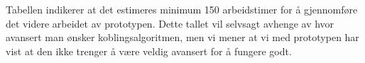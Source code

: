 Tabellen indikerer at det estimeres minimum 150 arbeidstimer for å gjennomføre det videre arbeidet av prototypen. Dette tallet vil selvsagt avhenge av hvor avansert man ønsker koblingsalgoritmen, men vi mener at vi med prototypen har vist at den ikke trenger å være veldig avansert for å fungere godt.
